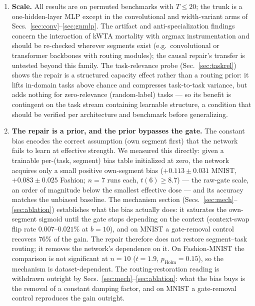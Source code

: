 \documentclass[review,12pt,number]{elsarticle}
\begin{document}
\begin{enumerate}
\item \textbf{Scale.} All results are on permuted benchmarks with $T \le 20$; the trunk is a
      one-hidden-layer MLP except in the convolutional and width-variant arms
      of Secs.~\ref{sec:conv}--\ref{sec:gnmlp}. The artifact and
      anti-specialization findings concern the interaction of kWTA
      mortality with argmax instrumentation and should be re-checked
      wherever segments exist (e.g.\ convolutional or transformer backbones
      with routing modules); the causal repair's transfer is untested
      beyond this family. The task-relevance probe
      (Sec.~\ref{sec:taskrel}) shows the repair is a structured capacity
      effect rather than a routing prior: it lifts in-domain tasks above
      chance and compresses task-to-task variance, but adds nothing for
      zero-relevance (random-label) tasks --- so its benefit is
      contingent on the task stream containing learnable structure, a
      condition that should be verified per architecture and benchmark
      before generalizing.
\item \textbf{The repair is a prior, and the prior bypasses the gate.}
      The constant bias
      encodes the correct assumption (own segment first) that the network
      fails to learn at effective strength. We measured this directly:
      given a trainable per-(task, segment) bias table initialized at
      zero, the network acquires only a small positive own-segment bias
      ($+0.113 \pm 0.031$ MNIST, $+0.083 \pm 0.025$ Fashion; $n{=}7$
      runs each, $t(6) \ge 8.7$) --- the raw-gate scale, an order of
      magnitude below the smallest effective dose --- and its accuracy
      matches the unbiased baseline. The mechanism section (Secs.~\ref{sec:mech}--\ref{sec:ablation}) establishes what the bias actually
does: it saturates the own-segment sigmoid until the gate stops
      depending on the context (context-swap flip rate $0.007$--$0.021\%$ at
      $b{=}10$), and on MNIST a gate-removal control recovers $76\%$ of the
      gain. The repair therefore does not restore segment--task routing;
      it removes the network's dependence on it. On Fashion-MNIST the
      comparison is not significant at $n{=}10$ ($t{=}1.9$, $p_{\mathrm{Holm}}=0.15$),
      so the mechanism is dataset-dependent. The routing-restoration reading
      is withdrawn outright by Secs.~\ref{sec:mech}--\ref{sec:ablation}:
      what the bias buys is the removal of a constant damping factor,
      and on MNIST a gate-removal control reproduces the gain outright.

\end{enumerate}
\end{document}
